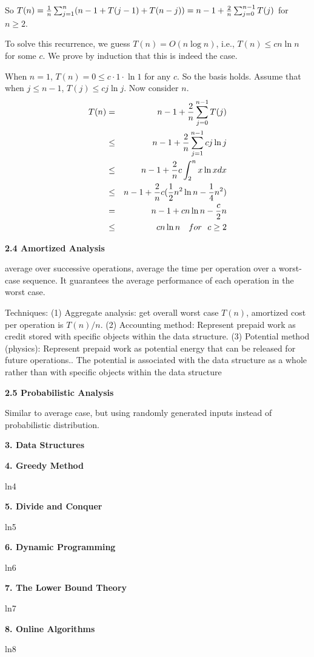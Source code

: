 \documentclass[8pt]{minimal}
\begin{document}
\begin{flushleft}
\begin{multicols}{3}
So $T(n)={1\over n}\sum_{j=1}^n(n-1+T(j-1)+T(n-j))=n-1+{2\over n}
\sum_{j=0}^{n-1}T(j)$ for $n\ge2$.

To solve this recurrence, we guess $T(n)=O(n\log n)$, i.e., 
$T(n)\le cn\ln n$ for some $c$. We prove by induction that
this is indeed the case.

When $n=1$, $T(n)=0\le c\cdot 1\cdot \ln 1$ for any $c$. So the
basis holds. Assume that when $j\le n-1$, $T(j)\le cj\ln j$.
Now consider $n$.
\begin{eqnarray*}
T(n)&=&n-1+{2\over n}\sum_{j=0}^{n-1}T(j)\\
&\le&n-1+{2\over n}\sum_{j=1}^{n-1}cj\ln j\\
&\le&n-1+{2\over n}c\int_2^n x\ln xdx\\
&\le&n-1+{2\over n}c({1\over2}n^2\ln n-{1\over4}n^2)\\
&=&n-1+cn\ln n-{c\over2}n\\
&\le&cn\ln n { \quad for\ \ } c\ge  2
\end{eqnarray*}


    \textbf{2.4 Amortized Analysis}

average over successive operations,
average the time per operation over a worst-case sequence.
It guarantees the average performance of each operation in the worst case.

Techniques:
(1) Aggregate analysis: get overall worst case $T(n)$, amortized cost per operation is $T(n) / n$.
(2) Accounting method: Represent prepaid work as credit stored with speciﬁc objects within the data
structure.
(3) Potential method (physics): Represent prepaid work as potential energy that can be released for future operations..
The potential is associated with the data structure as a whole rather than with speciﬁc objects within the data
structure

    \textbf{2.5 Probabilistic Analysis}

Similar to average case, but using randomly generated inputs instead of probabilistic distribution.


    \textbf{3. Data Structures}

    


    \textbf{4. Greedy Method}

    ln4


    \textbf{5. Divide and Conquer}

    ln5


    \textbf{6. Dynamic Programming}

    ln6


    \textbf{7. The Lower Bound Theory}

    ln7


    \textbf{8. Online Algorithms}

    ln8
    

    \lipsum
    \lipsum

\end{multicols}
\end{flushleft}
\end{document}
